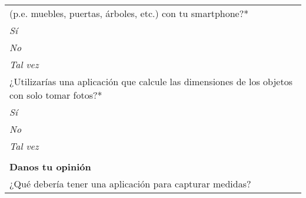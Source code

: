 \begin{center}
\begin{tabular}{|p{16cm}|}
	   (p.e. muebles, puertas, árboles, etc.) con tu smartphone?\textcolor{rojo}{*}\\
	   \hspace{1cm}\textit{Sí}\\
	   \hspace{1cm}\textit{No}\\
	   \hspace{1cm}\textit{Tal vez}\\
	   \hline
	   ¿Utilizarías una aplicación que calcule las dimensiones de los objetos con solo tomar fotos?\textcolor{rojo}{*}\\
	   \hspace{1cm}\textit{Sí}\\
	   \hspace{1cm}\textit{No}\\
	   \hspace{1cm}\textit{Tal vez}\\
	   \hline
	\rowcolor[rgb]{0.8,0.8,0.8}\\
            \rowcolor[rgb]{0.8,0.8,0.8}
            \textbf{\color{darkgray}Danos tu opinión} \\ [0.3cm]
            ¿Qué debería tener una aplicación para capturar medidas?\\
            \hline
    \end{tabular}
    \end{center}

